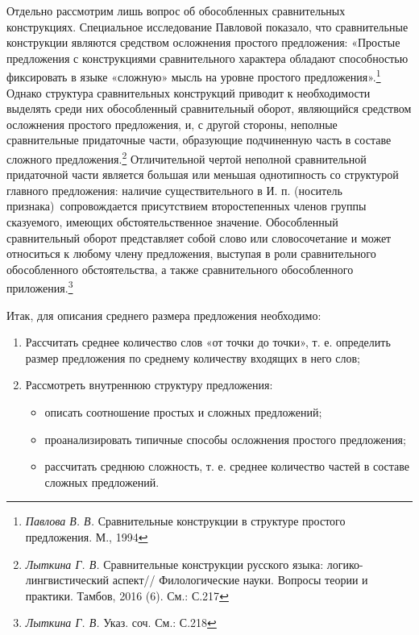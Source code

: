 \documentclass{kursa4}
\begin{document}
      Отдельно рассмотрим лишь вопрос об обособленных сравнительных
      конструкциях. Специальное исследование Павловой показало, что
      сравнительные конструкции являются средством осложнения простого
      предложения: «Простые предложения с конструкциями сравнительного
      характера обладают способностью фиксировать в языке «сложную» мысль на
      уровне простого предложения».\footnote{\textit{Павлова В. В.
      }Сравнительные конструкции в структуре простого предложения. М., 1994}
      Однако структура сравнительных конструкций приводит к необходимости
      выделять среди них обособленный сравнительный оборот, являющийся
      средством осложнения простого предложения, и, с другой стороны,
      неполные сравнительные придаточные части, образующие подчиненную часть
      в составе сложного предложения.\footnote{\textit{Лыткина Г. В.
      }Сравнительные конструкции русского языка: логико-лингвистический
      аспект// Филологические науки. Вопросы теории и практики. Тамбов, 2016
      (6). См.: С.217} Отличительной чертой неполной сравнительной
      придаточной части является большая или меньшая однотипность со
      структурой главного предложения: наличие существительного в И. п.
      (носитель признака)~сопровождается присутствием второстепенных членов
      группы сказуемого, имеющих обстоятельственное значение. Обособленный
      сравнительный оборот представляет собой слово или словосочетание и
      может относиться к любому члену предложения, выступая в роли
      сравнительного обособленного обстоятельства, а также сравнительного
      обособленного приложения.\footnote{\textit{Лыткина Г. В. }Указ. соч.
      См.: С.218} 

      Итак, для описания среднего размера предложения необходимо:
      \begin{enumerate}
        \item Рассчитать среднее количество слов «от точки до точки», т. е.
      определить размер предложения по среднему количеству входящих в него
      слов;
        \item Рассмотреть внутреннюю структуру предложения: 
        \begin{itemize}
          \item описать соотношение простых и сложных предложений;
          \item проанализировать типичные способы осложнения простого предложения;
          \item рассчитать среднюю сложность, т. е. среднее количество частей в
          составе сложных предложений.
        \end{itemize}
      \end{enumerate}
\end{document}
